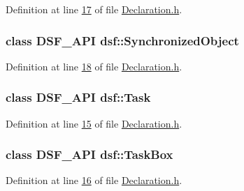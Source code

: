Definition at line \hyperlink{_declaration_8h_source_l00017}{17} of file \hyperlink{_declaration_8h_source}{Declaration.\+h}.

\hypertarget{namespacedsf_acbf1798fc56cfb1707162a17e13f5fda}{}
\subsubsection[{Synchronized\+Object}]{\setlength{\rightskip}{0pt plus 5cm}class {\bf D\+S\+F\+\_\+\+A\+P\+I} {\bf dsf\+::\+Synchronized\+Object}}\label{namespacedsf_acbf1798fc56cfb1707162a17e13f5fda}


Definition at line \hyperlink{_declaration_8h_source_l00018}{18} of file \hyperlink{_declaration_8h_source}{Declaration.\+h}.

\hypertarget{namespacedsf_a7df24c7d3d82e2e686aa3a524dc1dee9}{}
\subsubsection[{Task}]{\setlength{\rightskip}{0pt plus 5cm}class {\bf D\+S\+F\+\_\+\+A\+P\+I} {\bf dsf\+::\+Task}}\label{namespacedsf_a7df24c7d3d82e2e686aa3a524dc1dee9}


Definition at line \hyperlink{_declaration_8h_source_l00015}{15} of file \hyperlink{_declaration_8h_source}{Declaration.\+h}.

\hypertarget{namespacedsf_ac3c92e2a98380dd728b0c18d0c495966}{}
\subsubsection[{Task\+Box}]{\setlength{\rightskip}{0pt plus 5cm}class {\bf D\+S\+F\+\_\+\+A\+P\+I} {\bf dsf\+::\+Task\+Box}}\label{namespacedsf_ac3c92e2a98380dd728b0c18d0c495966}


Definition at line \hyperlink{_declaration_8h_source_l00016}{16} of file \hyperlink{_declaration_8h_source}{Declaration.\+h}.

